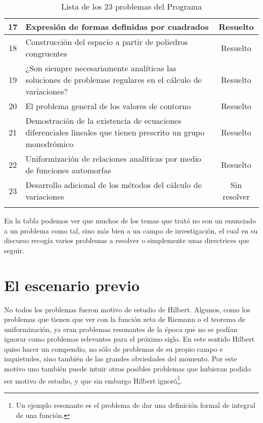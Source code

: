 \begin{longtable}{|c|p{7cm}|c|}
    17 & Expresión de formas definidas por cuadrados & Resuelto \\ \midrule
    18 & Construcción del espacio a partir de poliedros congruentes & Resuelto \\ \midrule
    19 & ¿Son siempre necesariamente analíticas las soluciones de 
        problemas regulares en el cálculo de variaciones? & Resuelto \\ \midrule
    20 & El problema general de los valores de contorno & Resuelto \\ \midrule
    21 & Demostración de la existencia de ecuaciones diferenciales
        lineales que tienen prescrito un grupo monodrómico & Resuelto \\ \midrule
    22 & Uniformización de relaciones analíticas 
        por medio de funciones automorfas & Resuelto \\ \midrule
    23 & Desarrollo adicional de los métodos del cálculo de variaciones & Sin resolver \\ \bottomrule
  \caption{Lista de los 23 problemas del Programa}
  \label{tb:programa}
\end{longtable}

En la tabla podemos ver que muchos de los temas que trató no son un enunciado a un problema como tal, sino más bien a un campo de investigación, el cual en su 
discurso recogía varios problemas a resolver o simplemente unas directrices que seguir.



\section{El escenario previo}

No todos los problemas fueron motivo de estudio de Hilbert. Algunos, como los problemas que tienen que ver con la función zeta de Riemann o el teorema de uniformización,
ya eran problemas resonantes de la época que no se podían ignorar como problemas relevantes para el próximo siglo. En este sentido Hilbert quiso hacer un compendio, 
no sólo de problemas de su propio campo e inquietudes, sino también de las grandes obviedades del momento. Por este motivo uno también puede intuir otros posibles problemas
que hubieran podido ser motivo de estudio, y que sin embargo Hilbert ignoró\footnote{Un ejemplo resonante es el problema de dar una definición formal de integral de una función.}.

